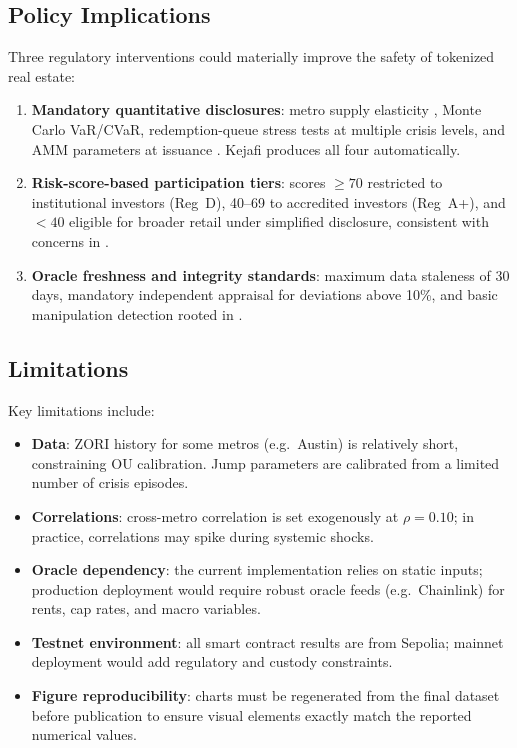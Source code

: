 \documentclass[11pt,letterpaper]{article}
\begin{document}
\subsection{Policy Implications}

Three regulatory interventions could materially improve the safety of tokenized real estate:

\begin{enumerate}[leftmargin=2em]
  \item \textbf{Mandatory quantitative disclosures}: metro supply elasticity
  \citep{saiz2010}, Monte Carlo VaR/CVaR, redemption-queue stress tests at multiple crisis
  levels, and AMM parameters at issuance \citep{angeris2020}. Kejafi produces all four
  automatically.
  \item \textbf{Risk-score-based participation tiers}: scores $\geq 70$ restricted to
  institutional investors (Reg~D), 40--69 to accredited investors (Reg~A+), and $< 40$
  eligible for broader retail under simplified disclosure, consistent with concerns in
  \citet{bis2025}.
  \item \textbf{Oracle freshness and integrity standards}: maximum data staleness of 30
  days, mandatory independent appraisal for deviations above 10\%, and basic manipulation
  detection rooted in \citet{angeris2020}.
\end{enumerate}

\subsection{Limitations}

Key limitations include:

\begin{itemize}[leftmargin=2em]
  \item \textbf{Data}: ZORI history for some metros (e.g.\ Austin) is relatively short,
  constraining OU calibration. Jump parameters are calibrated from a limited number of
  crisis episodes.
  \item \textbf{Correlations}: cross-metro correlation is set exogenously at $\rho=0.10$;
  in practice, correlations may spike during systemic shocks.
  \item \textbf{Oracle dependency}: the current implementation relies on static inputs;
  production deployment would require robust oracle feeds (e.g.\ Chainlink) for rents,
  cap rates, and macro variables.
  \item \textbf{Testnet environment}: all smart contract results are from Sepolia; mainnet
  deployment would add regulatory and custody constraints.
  \item \textbf{Figure reproducibility}: charts must be regenerated from the final dataset
  before publication to ensure visual elements exactly match the reported numerical values.
\end{itemize}
\end{document}
